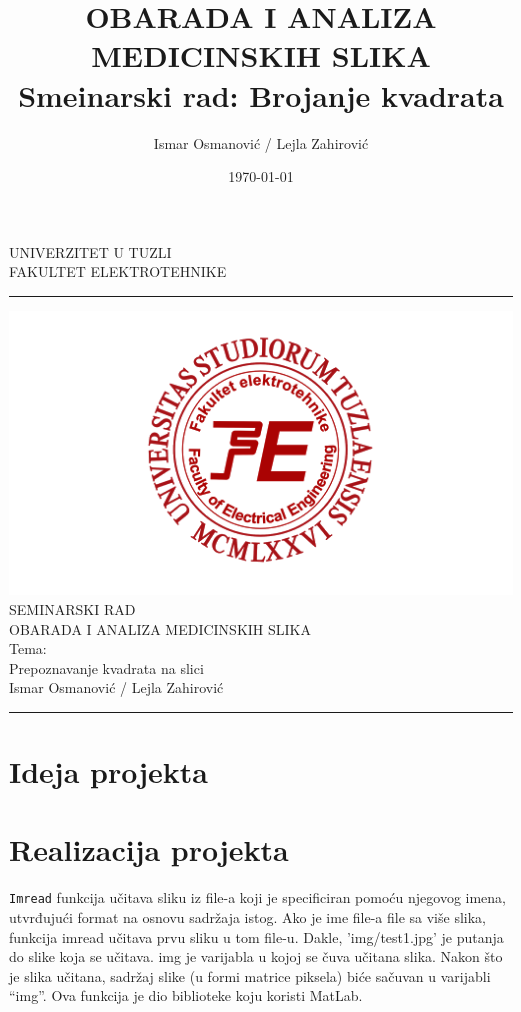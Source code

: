 \documentclass[a4paper,12pt]{article}
\title{OBARADA I ANALIZA MEDICINSKIH SLIKA \\ Smeinarski rad: Brojanje kvadrata}
\author{Ismar Osmanović / Lejla Zahirović}
\date{\today}
\begin{document}
\begin{center}
\thispagestyle{empty}
\large{UNIVERZITET U TUZLI \\ FAKULTET ELEKTROTEHNIKE}

\noindent\rule[7pt]{\linewidth}{0.4pt}


  \includegraphics[width=0.7\linewidth]{fet_logo.png}
\vspace{3cm}\\
{\fontsize{34pt}{28pt}\selectfont SEMINARSKI RAD}\\
\large{OBARADA I ANALIZA MEDICINSKIH SLIKA}\\
\vspace{2cm}
\Huge{Tema:}\\
\Huge{Prepoznavanje kvadrata na slici}\\
\vspace{0.5cm}
\large{Ismar Osmanović / Lejla Zahirović}
\vfill

\noindent\rule[7pt]{\linewidth}{0.4pt}
\end{center}
\newpage
\tableofcontents
\newpage
{} 

\section{Ideja projekta}
\section{Realizacija projekta}

\texttt{Imread} funkcija učitava sliku iz file-a koji je specificiran pomoću njegovog imena, utvrđujući format  na osnovu sadržaja istog. Ako je ime file-a file sa više slika, funkcija imread učitava prvu sliku u tom file-u.
Dakle, 'img/test1.jpg' je putanja do slike koja se učitava. img je varijabla u kojoj se čuva učitana slika. Nakon što je slika učitana, sadržaj slike (u formi matrice piksela) biće sačuvan u varijabli “img”. Ova funkcija je dio biblioteke koju koristi MatLab.
\end{document}

